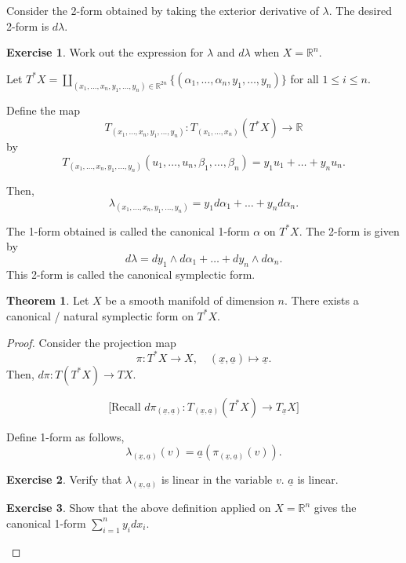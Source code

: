 \documentclass[11pt]{article}
\theoremstyle{definition}
\newtheorem{theorem}{Theorem}[section]
\newtheorem{exercise}{Exercise}
\theoremstyle{remark}
\begin{document}
Consider the 2-form obtained by taking the exterior derivative of $\lambda$. The desired 2-form is $d\lambda$.

\begin{exercise}
Work out the expression for $\lambda$ and $d\lambda$ when $X = \mathbb{R}^n$.

Let $T^*X = \coprod_{(x_1, \dots, x_n, y_1, \dots, y_n) \in \mathbb{R}^{2n}} \{(\alpha_1, \dots, \alpha_n, y_1, \dots, y_n)\}$ for all $1 \leq i \leq n$.

Define the map
\[
T_{(x_1, \dots, x_n, y_1, \dots, y_n)} \colon T_{(x_1, \dots, x_n)}(T^*X) \to \mathbb{R}
\]
by
\[
T_{(x_1, \dots, x_n, y_1, \dots, y_n)}(u_1, \dots, u_n, \beta_1, \dots, \beta_n) = y_1 u_1 + \dots + y_n u_n.
\]

Then,
\[
\lambda_{(x_1, \dots, x_n, y_1, \dots, y_n)} = y_1 d\alpha_1 + \dots + y_n d\alpha_n.
\]

The 1-form obtained is called the canonical 1-form $\alpha$ on $T^*X$. The 2-form is given by
\[
d\lambda = dy_1 \wedge d\alpha_1 + \dots + dy_n \wedge d\alpha_n.
\]
This 2-form is called the canonical symplectic form.
\end{exercise}

\begin{theorem}\label{thm:canonical_symplectic_form}
Let $X$ be a smooth manifold of dimension $n$. There exists a canonical / natural symplectic form on $T^*X$.
\end{theorem}

\begin{proof}
Consider the projection map
\[
\pi \colon T^*X \to X, \quad (\underline{x}, \underline{a}) \mapsto \underline{x}.
\]
Then, $d\pi \colon T(T^*X) \to TX$.

\[
\text{[Recall } d\pi_{(\underline{x}, \underline{a})} \colon T_{(\underline{x}, \underline{a})}(T^*X) \to T_{\underline{x}}X\text{]}
\]

Define 1-form as follows,
\[
\lambda_{(\underline{x}, \underline{a})}(v) = \underline{a} \left( \pi_{(\underline{x}, \underline{a})}(v) \right).
\]

\begin{exercise}\label{ex:linearity}
Verify that $\lambda_{(\underline{x}, \underline{a})}$ is linear in the variable $v$. $\underline{a}$ is linear.
\end{exercise}

\begin{exercise}\label{ex:canonical_form}
Show that the above definition applied on $X = \mathbb{R}^n$ gives the canonical 1-form $\sum_{i=1}^n y_i dx_i$.
\end{exercise}
\end{proof}
\end{document}
